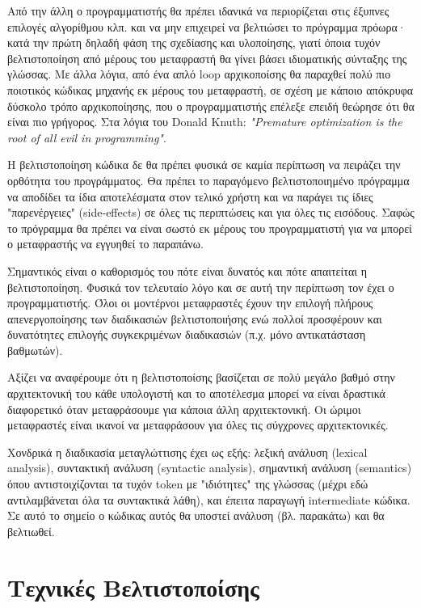 Από την άλλη ο προγραμματιστής θα πρέπει ιδανικά να περιορίζεται στις έξυπνες
επιλογές αλγορίθμου κλπ. και να μην επιχειρεί να βελτιώσει το πρόγραμμα πρόωρα·
κατά την πρώτη δηλαδή φάση της σχεδίασης και υλοποίησης, γιατί όποια τυχόν
βελτιστοποίηση από μέρους του μεταφραστή θα γίνει βάσει ιδιοματικής σύνταξης της
γλώσσας. Με άλλα λόγια, από ένα απλό loop αρχικοποίσης θα παραχθεί πολύ πιο
ποιοτικός κώδικας μηχανής εκ μέρους του μεταφραστή, σε σχέση με κάποιο απόκρυφα
δύσκολο τρόπο αρχικοποίησης, που ο προγραμματιστής επέλεξε επειδή θεώρησε ότι θα
είναι πιο γρήγορος. Στα λόγια του Donald Knuth: \textit{"Premature optimization
is the root of all evil in programming"}.\cite{knuth}

Η βελτιστοποίηση κώδικα δε θα πρέπει φυσικά σε καμία περίπτωση να πειράζει την
ορθότητα του προγράμματος. Θα πρέπει το παραγόμενο βελτιστοποιημένο πρόγραμμα να
αποδίδει τα ίδια αποτελέσματα στον τελικό χρήστη και να παράγει τις ίδιες
"παρενέργειες" (side-effects) σε όλες τις περιπτώσεις και για όλες τις εισόδους.
Σαφώς το πρόγραμμα θα πρέπει να είναι σωστό εκ μέρους του προγραμματιστή για να
μπορεί ο μεταφραστής να εγγυηθεί το παραπάνω.

Σημαντικός είναι ο καθορισμός του πότε είναι δυνατός και πότε απαιτείται η
βελτιστοποίηση. Φυσικά τον τελευταίο λόγο και σε αυτή την περίπτωση τον έχει ο
προγραμματιστής. Όλοι οι μοντέρνοι μεταφραστές έχουν την επιλογή πλήρους
απενεργοποίησης των διαδικασιών βελτιστοποιήσης ενώ πολλοί προσφέρουν και
δυνατότητες επιλογής συγκεκριμένων διαδικασιών (π.χ. μόνο αντικατάσταση
βαθμωτών).

Αξίζει να αναφέρουμε ότι η βελτιστοποίσης βασίζεται σε πολύ μεγάλο βαθμό στην
αρχιτεκτονική του κάθε υπολογιστή και το αποτέλεσμα μπορεί να είναι δραστικά
διαφορετικό όταν μεταφράσουμε για κάποια άλλη αρχιτεκτονική. Οι ώριμοι
μεταφραστές είναι ικανοί να μεταφράσουν για όλες τις σύγχρονες αρχιτεκτονικές.

Χονδρικά η διαδικασία μεταγλώττισης έχει ως εξής: λεξική ανάλυση (lexical
analysis), συντακτική ανάλυση (syntactic analysis), σημαντική ανάλυση
(semantics) όπου αντιστοιχίζονται τα τυχόν token με "ιδιότητες" της γλώσσας
(μέχρι εδώ αντιλαμβάνεται όλα τα συντακτικά λάθη), και έπειτα παραγωγή
intermediate κώδικα. Σε αυτό το σημείο ο κώδικας αυτός θα υποστεί ανάλυση (βλ.
παρακάτω) και θα βελτιωθεί.


\section{Τεχνικές Βελτιστοποίσης}

